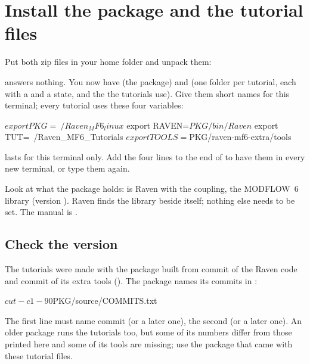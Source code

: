 \section{Install the package and the tutorial files}
Put both zip files in your home folder and unpack them:
 answers nothing. You now have  (the package) and
 (one folder per tutorial, each with a  and a  state, and the
 the tutorials use). Give them short names for this terminal; every tutorial uses these four variables:
\begin{shell}
$ export PKG=~/Raven_MF6_linux
$ export RAVEN=$PKG/bin/Raven
$ export TUT=~/Raven_MF6_Tutorials
$ export TOOLS=$PKG/raven-mf6-extra/tools
\end{shell}
\begin{note}
 lasts for this terminal only. Add the four lines to the end of  to have them in every
new terminal, or type them again.
\end{note}
Look at what the package holds:
 is Raven with the coupling,  the MODFLOW~6 library (version ). Raven finds the
library beside itself; nothing else needs to be set. The manual is .

\subsection{Check the version}
The tutorials were made with the package built from commit  of the Raven code and commit
 of its extra tools (). The package names its commits in
:
\begin{shell}
$ cut -c1-90 $PKG/source/COMMITS.txt
\end{shell}
The first line must name commit  (or a later one), the second  (or a later
one). An older package runs the tutorials too, but some of its numbers differ from those printed here and some of its tools
are missing; use the package that came with these tutorial files.


